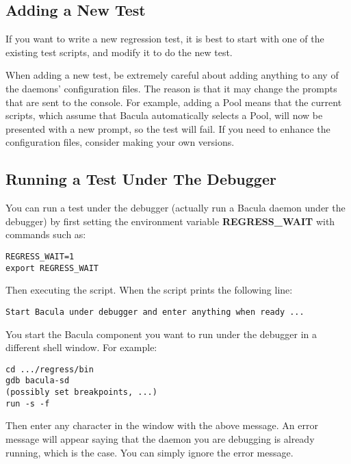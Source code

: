 \subsection{Adding a New Test}

If you want to write a new regression test, it is best to start with one of
the existing test scripts, and modify it to do the new test.

When adding a new test, be extremely careful about adding anything to any of
the daemons' configuration files. The reason is that it may change the prompts
that are sent to the console. For example, adding a Pool means that the
current scripts, which assume that Bacula automatically selects a Pool, will
now be presented with a new prompt, so the test will fail. If you need to
enhance the configuration files, consider making your own versions.

\subsection{Running a Test Under The Debugger}
You can run a test under the debugger (actually run a Bacula daemon
under the debugger) by first setting the environment variable
{\bf REGRESS\_WAIT} with commands such as:

\begin{verbatim}
REGRESS_WAIT=1
export REGRESS_WAIT
\end{verbatim}

Then executing the script.  When the script prints the following line:

\begin{verbatim}
Start Bacula under debugger and enter anything when ready ...
\end{verbatim}

You start the Bacula component you want to run under the debugger in a
different shell window.  For example:

\begin{verbatim}
cd .../regress/bin
gdb bacula-sd
(possibly set breakpoints, ...)
run -s -f
\end{verbatim}

Then enter any character in the window with the above message.
An error message will appear saying that the daemon you are debugging
is already running, which is the case. You can simply ignore the
error message.
